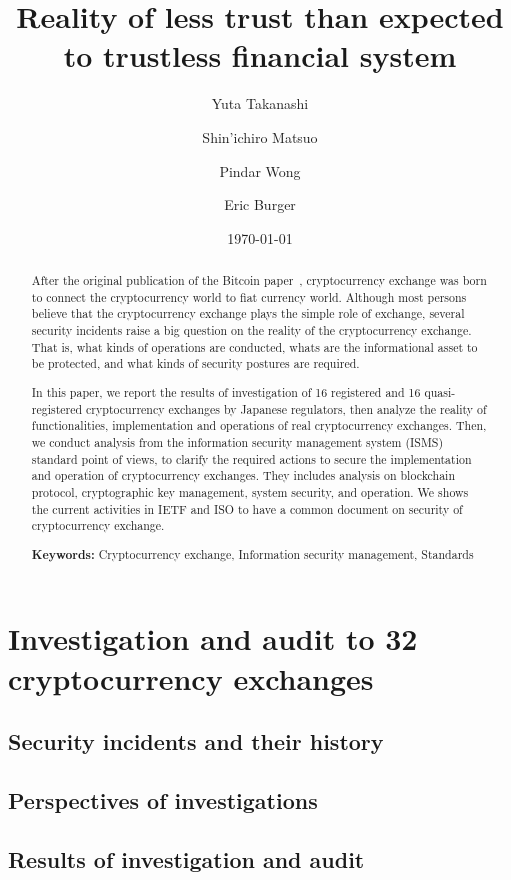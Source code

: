 \documentclass[english]{llncs}
\title{Reality of less trust than expected to trustless financial system}
\author{
Yuta Takanashi\inst{1,2}\and Shin'ichiro Matsuo \inst{1} \and Pindar Wong\inst{3} \and Eric Burger\inst{1}}
\institute{Georgetown University
\and Financial Services Agency
\and VeriFi Ltd.}
\date{\today}
\begin{document}
\maketitle

\begin{abstract}
After the original publication of the Bitcoin paper~\cite{N08}, cryptocurrency exchange was born to connect the cryptocurrency world 
to fiat currency world. Although most persons believe that the cryptocurrency exchange plays the simple role of exchange, 
several security incidents raise a big question on the reality of the cryptocurrency exchange. That is, what kinds of operations
are conducted, whats are the informational asset to be protected, and what kinds of security postures are required.

In this paper, we report the results of investigation of 16 registered and 16 quasi-registered cryptocurrency
exchanges by Japanese regulators, then analyze the reality of functionalities, implementation and operations of real cryptocurrency exchanges.
Then, we conduct analysis from the information security management system (ISMS) standard point of views, to clarify
the required actions to secure the implementation and operation of cryptocurrency exchanges. They includes analysis on
blockchain protocol, cryptographic key management, system security, and operation. We shows the current activities in IETF and 
ISO to have a common document on security of cryptocurrency exchange.

{\bf Keywords:} Cryptocurrency exchange, Information security management, Standards
\end{abstract}




\section{Investigation and audit to 32 cryptocurrency exchanges}
\subsection{Security incidents and their history}
\subsection{Perspectives of investigations}
\subsection{Results of investigation and audit}
\end{document}
